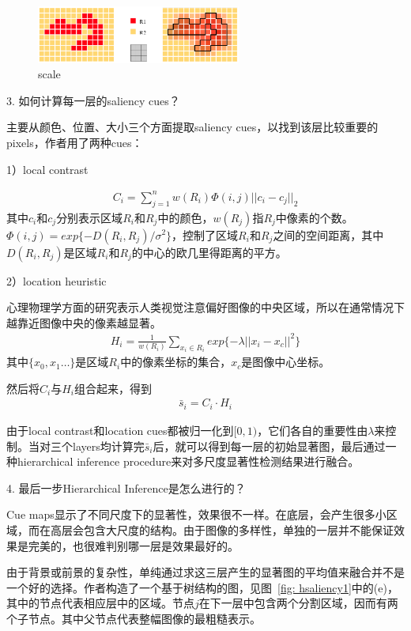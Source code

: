 \documentclass[12pt]{article}
\begin{document}
\begin{figure}[!ht]
\centering
\includegraphics[width=0.6\textwidth]{hsaliency4.png}
\caption{scale}
\label{fig: hsaliency4}
\end{figure}

3. 如何计算每一层的saliency cues？

主要从颜色、位置、大小三个方面提取saliency cues，以找到该层比较重要的pixels，作者用了两种cues：

1）local contrast

\begin{align}
C_i = \sum_{j=1}^{n}w(R_i)\Phi(i, j)||c_i-c_j||_2
\end{align}
其中$c_i$和$c_j$分别表示区域$R_i$和$R_j$中的颜色，$w(R_j)$指$R_j$中像素的个数。$\Phi(i, j) = exp\{-D(R_i, R_j)/\sigma^2\}$，控制了区域$R_i$和$R_j$之间的空间距离，其中$D(R_i, R_j)$是区域$R_i$和$R_j$的中心的欧几里得距离的平方。

2）location heuristic

心理物理学方面的研究表示人类视觉注意偏好图像的中央区域，所以在通常情况下越靠近图像中央的像素越显著。
\begin{align}
H_i = \frac{1}{w(R_i)}\sum_{x_i \in R_i} exp\{-\lambda||x_i-x_c||^2\}
\end{align}
其中$\{x_0, x_1\ldots\}$是区域$R_i$中的像素坐标的集合，$x_c$是图像中心坐标。

然后将$C_i$与$H_i$组合起来，得到
\begin{align}
\bar{s}_i = C_i \cdot H_i
\end{align}

由于local contrast和location cues都被归一化到$[0, 1)$，它们各自的重要性由$\lambda$来控制。当对三个layers均计算完$\bar{s}_i$后，就可以得到每一层的初始显著图，最后通过一种hierarchical inference procedure来对多尺度显著性检测结果进行融合。

4. 最后一步Hierarchical Inference是怎么进行的？

Cue maps显示了不同尺度下的显著性，效果很不一样。在底层，会产生很多小区域，而在高层会包含大尺度的结构。由于图像的多样性，单独的一层并不能保证效果是完美的，也很难判别哪一层是效果最好的。

由于背景或前景的复杂性，单纯通过求这三层产生的显著图的平均值来融合并不是一个好的选择。作者构造了一个基于树结构的图，见图~\ref{fig: hsaliency1}中的(e)，其中的节点代表相应层中的区域。节点$j$在下一层中包含两个分割区域，因而有两个子节点。其中父节点代表整幅图像的最粗糙表示。
\end{document}

